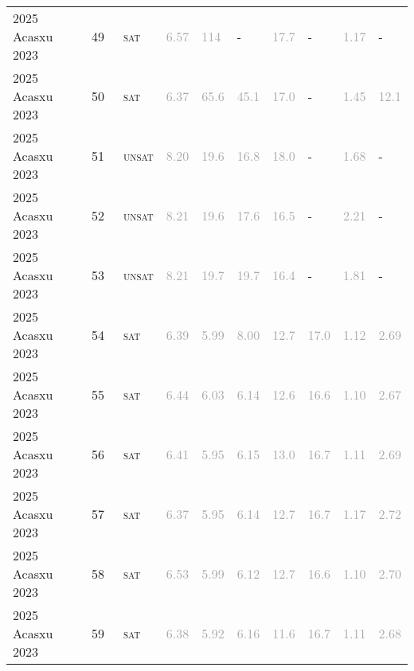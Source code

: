 \begin{center}
{\begin{longtable}{@{}llllllllll@{}}
2025 Acasxu 2023 & 49 & ~\textsc{sat} & \textcolor{darkgray}{6.57} & \textcolor{darkgray}{114} & - & \textcolor{darkgray}{17.7} & - & \textcolor{darkgray}{1.17} & - \\
2025 Acasxu 2023 & 50 & ~\textsc{sat} & \textcolor{darkgray}{6.37} & \textcolor{darkgray}{65.6} & \textcolor{darkgray}{45.1} & \textcolor{darkgray}{17.0} & - & \textcolor{darkgray}{1.45} & \textcolor{darkgray}{12.1} \\
2025 Acasxu 2023 & 51 & ~\textsc{unsat} & \textcolor{darkgray}{8.20} & \textcolor{darkgray}{19.6} & \textcolor{darkgray}{16.8} & \textcolor{darkgray}{18.0} & - & \textcolor{darkgray}{1.68} & - \\
2025 Acasxu 2023 & 52 & ~\textsc{unsat} & \textcolor{darkgray}{8.21} & \textcolor{darkgray}{19.6} & \textcolor{darkgray}{17.6} & \textcolor{darkgray}{16.5} & - & \textcolor{darkgray}{2.21} & - \\
2025 Acasxu 2023 & 53 & ~\textsc{unsat} & \textcolor{darkgray}{8.21} & \textcolor{darkgray}{19.7} & \textcolor{darkgray}{19.7} & \textcolor{darkgray}{16.4} & - & \textcolor{darkgray}{1.81} & - \\
2025 Acasxu 2023 & 54 & ~\textsc{sat} & \textcolor{darkgray}{6.39} & \textcolor{darkgray}{5.99} & \textcolor{darkgray}{8.00} & \textcolor{darkgray}{12.7} & \textcolor{darkgray}{17.0} & \textcolor{darkgray}{1.12} & \textcolor{darkgray}{2.69} \\
2025 Acasxu 2023 & 55 & ~\textsc{sat} & \textcolor{darkgray}{6.44} & \textcolor{darkgray}{6.03} & \textcolor{darkgray}{6.14} & \textcolor{darkgray}{12.6} & \textcolor{darkgray}{16.6} & \textcolor{darkgray}{1.10} & \textcolor{darkgray}{2.67} \\
2025 Acasxu 2023 & 56 & ~\textsc{sat} & \textcolor{darkgray}{6.41} & \textcolor{darkgray}{5.95} & \textcolor{darkgray}{6.15} & \textcolor{darkgray}{13.0} & \textcolor{darkgray}{16.7} & \textcolor{darkgray}{1.11} & \textcolor{darkgray}{2.69} \\
2025 Acasxu 2023 & 57 & ~\textsc{sat} & \textcolor{darkgray}{6.37} & \textcolor{darkgray}{5.95} & \textcolor{darkgray}{6.14} & \textcolor{darkgray}{12.7} & \textcolor{darkgray}{16.7} & \textcolor{darkgray}{1.17} & \textcolor{darkgray}{2.72} \\
2025 Acasxu 2023 & 58 & ~\textsc{sat} & \textcolor{darkgray}{6.53} & \textcolor{darkgray}{5.99} & \textcolor{darkgray}{6.12} & \textcolor{darkgray}{12.7} & \textcolor{darkgray}{16.6} & \textcolor{darkgray}{1.10} & \textcolor{darkgray}{2.70} \\
2025 Acasxu 2023 & 59 & ~\textsc{sat} & \textcolor{darkgray}{6.38} & \textcolor{darkgray}{5.92} & \textcolor{darkgray}{6.16} & \textcolor{darkgray}{11.6} & \textcolor{darkgray}{16.7} & \textcolor{darkgray}{1.11} & \textcolor{darkgray}{2.68} \\

\end{longtable}}
\end{center}
